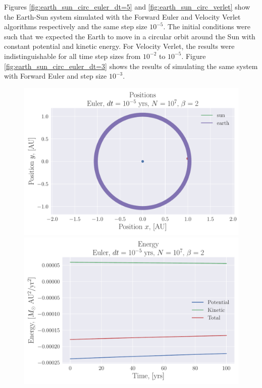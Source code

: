 \documentclass[reprint, english,notitlepage,nofootinbib]{revtex4-1}  %
\begin{document}
Figures \ref{fig:earth_sun_circ_euler_dt=5} and \ref{fig:earth_sun_circ_verlet} show the Earth-Sun system simulated with the Forward Euler and Velocity Verlet algorithms respectively and the same step size $10^{-5}$. The initial conditions were such that we expected the Earth to move in a circular orbit around the Sun with constant potential and kinetic energy. For Velocity Verlet, the results were indistinguishable for all time step sizes from $10^{-2}$ to $10^{-5}$. Figure \ref{fig:earth_sun_circ_euler_dt=3} shows the results of simulating the same system with Forward Euler and step size $10^{-3}$.

\begin{figure}
  \includegraphics[width=\linewidth]{../output/earth_sun_circ-euler-5-7-2.pdf}
  \includegraphics[width=\linewidth]{../output/earth_sun_circ-euler-5-7-2_energy.pdf}

\end{figure}
\end{document}
